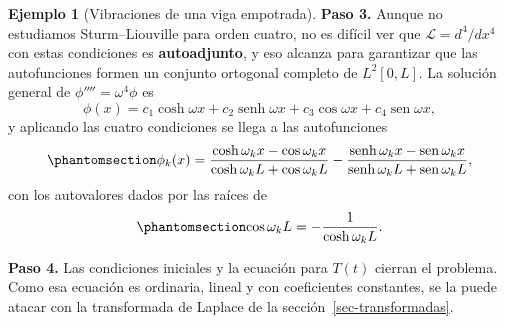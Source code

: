 \documentclass[
  spanish,
  a4paper,
]{scrbook}
\theoremstyle{definition}
\theoremstyle{plain}
\theoremstyle{definition}
\newtheorem{example}{Ejemplo}[chapter]
\theoremstyle{plain}
\theoremstyle{definition}
\theoremstyle{remark}
\begin{document}
\begin{example}[Vibraciones de una viga
empotrada]
\textbf{Paso 3.} Aunque no estudiamos Sturm--Liouville para orden
cuatro, no es difícil ver que \(\mathcal{L} = d^4/dx^4\) con estas
condiciones es \textbf{autoadjunto}, y eso alcanza para garantizar que
las autofunciones formen un conjunto ortogonal completo de \(L^2[0,L]\).
La solución general de \(\phi'''' = \omega^4\phi\) es \[
\phi(x) = c_1\cosh\omega x + c_2\operatorname{senh}\omega x + c_3\cos\omega x + c_4\operatorname{sen}\omega x ,
\] y aplicando las cuatro condiciones se llega a las autofunciones
\begin{equation}\protect\phantomsection\label{eq-modos-viga}{
\phi_k(x) = \frac{\cosh\omega_kx - \cos\omega_kx}{\cosh\omega_kL + \cos\omega_kL}
- \frac{\operatorname{senh}\omega_kx - \operatorname{sen}\omega_kx}{\operatorname{senh}\omega_kL + \operatorname{sen}\omega_kL} ,
}\end{equation} con los autovalores dados por las raíces de
\begin{equation}\protect\phantomsection\label{eq-autovalores-viga}{
\cos\omega_kL = -\frac{1}{\cosh\omega_kL} .
}\end{equation}

\textbf{Paso 4.} Las condiciones iniciales y la ecuación para \(T(t)\)
cierran el problema. Como esa ecuación es ordinaria, lineal y con
coeficientes constantes, se la puede atacar con la transformada de
Laplace de la sección~\ref{sec-transformadas}.

\end{example}
\end{document}
